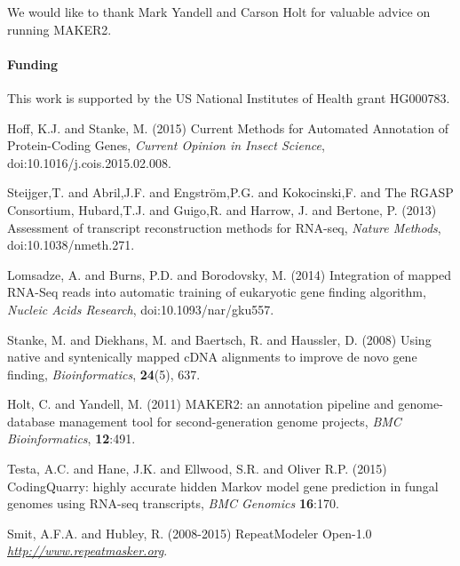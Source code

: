 \documentclass{bioinfo}
\begin{document}
We would like to thank Mark Yandell and Carson Holt for valuable advice on running MAKER2.

\paragraph{Funding\textcolon} This work is supported by the US National Institutes of Health grant HG000783.

%
%
%
%
%
%
%
%
%


\begin{thebibliography}{}
Hoff, K.J. and Stanke, M. (2015) Current Methods for Automated Annotation of Protein-Coding Genes, {\it Current Opinion in Insect Science}, doi:10.1016/j.cois.2015.02.008.

 Steijger,T. and Abril,J.F. and Engstr\"{o}m,P.G. and Kokocinski,F. and The RGASP Consortium, Hubard,T.J. and Guigo,R. and Harrow, J. and Bertone, P. (2013) Assessment of transcript reconstruction methods for
 RNA-seq, {\it Nature Methods}, doi:10.1038/nmeth.271.

 Lomsadze, A. and Burns, P.D. and Borodovsky, M. (2014) Integration of mapped RNA-Seq reads into automatic training of eukaryotic gene finding algorithm, {\it Nucleic Acids Research}, doi:10.1093/nar/gku557.

Stanke, M. and Diekhans, M. and Baertsch, R. and Haussler, D. (2008) Using native and syntenically mapped cDNA alignments to improve de novo gene finding, \textit{Bioinformatics}, \textbf{24}(5), 637.

 Holt, C. and Yandell, M. (2011) MAKER2: an annotation pipeline and genome-database management tool for second-generation genome projects, \textit{BMC Bioinformatics}, \textbf{12}:491.

 Testa, A.C. and Hane, J.K. and Ellwood, S.R. and Oliver R.P. (2015) CodingQuarry: highly accurate hidden Markov model gene prediction in fungal genomes using RNA-seq transcripts, \textit{BMC Genomics} \textbf{16}:170.

 Smit, A.F.A. and Hubley, R. (2008-2015) RepeatModeler Open-1.0 \textit{\url{http://www.repeatmasker.org}}.


\end{thebibliography}
\end{document}
